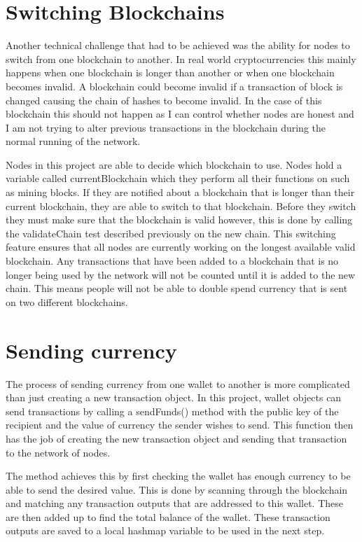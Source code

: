 \documentclass{l4proj}
\begin{document}
\section{Switching Blockchains}
Another technical challenge that had to be achieved was the ability for nodes to switch from one blockchain
to another. In real world cryptocurrencies this mainly happens when one blockchain is longer than another or
when one blockchain becomes invalid. A blockchain could become invalid if a transaction of block is changed 
causing the chain of hashes to become invalid. In the case of this blockchain this should not happen as I can
control whether nodes are honest and I am not trying to alter previous transactions in the blockchain during the normal
running of the network.

Nodes in this project are able to decide which blockchain to use. Nodes hold a variable called currentBlockchain
which they perform all their functions on such as mining blocks. If they are notified about a blockchain that is
longer than their current blockchain, they are able to switch to that blockchain. Before they switch they must 
make sure that the blockchain is valid however, this is done by calling the validateChain test described previously
on the new chain. This switching feature ensures that all nodes are currently working on the longest available
valid blockchain. Any transactions that have been added to a blockchain that is no longer being used by the network
will not be counted until it is added to the new chain. This means people will not be able to double spend currency
that is sent on two different blockchains.

\section{Sending currency}
The process of sending currency from one wallet to another is more complicated than just creating a new transaction
object. In this project, wallet objects can send transactions by calling a sendFunds() method with
the public key of the recipient and the value of currency the sender wishes to send. This function then has the job of
creating the new transaction object and sending that transaction to the network of nodes.

The method achieves this by first checking the wallet has enough currency to be able to send the desired value.
This is done by scanning through the blockchain and matching any transaction outputs that are addressed to this 
wallet. These are then added up to find the total balance of the wallet. These transaction outputs are saved to a
local hashmap variable to be used in the next step.
\end{document}

